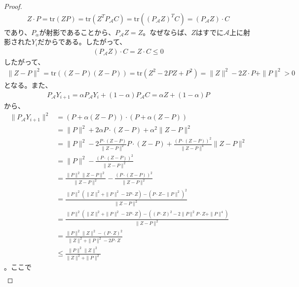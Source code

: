 \begin{proof}
  \begin{align*}
    Z \cdot P = \mathrm{tr}(Z P) = \mathrm{tr}(Z^T P_\mathcal{A} C) = \mathrm{tr}((P_\mathcal{A} Z)^T C) = (P_\mathcal{A} Z) \cdot C
  \end{align*}
  であり、$P_\alpha$が射影であることから、$P_\mathcal{A} Z = Z$。なぜならば、$Z$はすでに$\mathcal{A}$上に射影された$Y_i$だからである。したがって、
  \begin{align*}
    (P_\mathcal{A} Z) \cdot C = Z \cdot C \leq 0
  \end{align*}
  したがって、
  \begin{align*}
    \|Z - P\|^2 = \mathrm{tr}((Z - P)(Z - P)) = \mathrm{tr}(Z^2 - 2 P Z + P^2) = \|Z\|^2 - 2 Z \cdot P + \|P\|^2 > 0
  \end{align*}
  となる。また、
  \begin{align*}
    P_\mathcal{A} Y_{i + 1} = \alpha P_\mathcal{A} Y_i + (1 - \alpha) P_\mathcal{A} C = \alpha Z + (1 - \alpha) P
  \end{align*}
  から、
  \begin{align*}
    \|P_\mathcal{A} Y_{i + 1}\|^2 & = (P + \alpha (Z - P)) \cdot (P + \alpha (Z - P)) \\
                                  & = \|P\|^2 + 2 \alpha P \cdot (Z - P) + \alpha^2 \|Z - P\|^2 \\
                                  & = \|P\|^2 - 2 \frac{P \cdot (Z - P)}{\|Z - P\|^2} P \cdot (Z - P) + \frac{(P \cdot (Z - P))^2}{\|Z - P\|^4} \|Z - P\|^2 \\
                                  & = \|P\|^2 - \frac{(P \cdot (Z - P))^2}{\|Z - P\|^2} \\
                                  & = \frac{\|P\|^2 \|Z - P\|^2}{\|Z - P\|^2} - \frac{(P \cdot (Z - P))^2}{\|Z - P\|^2} \\
                                  & = \frac{\|P\|^2 (\|Z\|^2 + \|P\|^2 - 2 P \cdot Z) - (P \cdot Z - \|P\|^2)^2}{\|Z - P\|^2} \\
                                  & = \frac{\|P\|^2 (\|Z\|^2 + \|P\|^2 - 2 P \cdot Z) - ((P \cdot Z)^2 - 2 \|P\|^2 P \cdot Z + \|P\|^4)}{\|Z - P\|^2} \\
                                  & = \frac{\|P\|^2 \|Z\|^2 - (P \cdot Z)^2}{\|Z\|^2 + \|P\|^2 - 2 P \cdot Z} \\
                                  & \leq \frac{\|P\|^2 \|Z\|^2}{\|Z\|^2 + \|P\|^2}
  \end{align*}
  。ここで
  \begin{align*}

\end{align*}
\end{proof}
